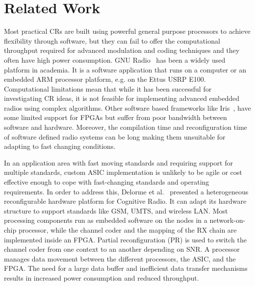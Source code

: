 \section{Related Work}
Most practical CRs are built using powerful general purpose processors to achieve flexibility through software, but they can fail to offer the computational throughput required for advanced modulation and coding techniques and they often have high power consumption.
GNU Radio~\cite{gnuradio} has been a widely used platform in academia.
It is a software application that runs on a computer or an embedded ARM processor platform, e.g. on the Ettus USRP E100.
Computational limitations mean that while it has been successful for investigating CR ideas, it is not feasible for implementing advanced embedded radios using complex algorithms.
Other software based frameworks like Iris~\cite{Sutton2010}, have some limited support for FPGAs but suffer from poor bandwidth between software and hardware.
Moreover, the compilation time and reconfiguration time of software defined radio systems can be long making them unsuitable for adapting to fast changing conditions.

In an application area with fast moving standards and requiring support for multiple standards, custom ASIC implementation is unlikely to be agile or cost effective enough to cope with fast-changing standards and operating requirements.
In order to address this, Delorme et al.~\cite{Delorme2008} presented a heterogeneous reconfigurable hardware platform for Cognitive Radio.
It can adapt its hardware structure to support standards like GSM, UMTS, and wireless LAN.
Most processing components run as embedded software on the nodes in a network-on-chip processor, while the channel coder and the mapping of the RX chain are implemented inside an FPGA.
Partial reconfiguration (PR) is used to switch the channel coder from one context to an another depending on SNR.
A processor manages data movement between the different processors, the ASIC, and the FPGA. The need for a large data buffer and inefficient data transfer mechanisms results in increased power consumption and reduced throughput.

